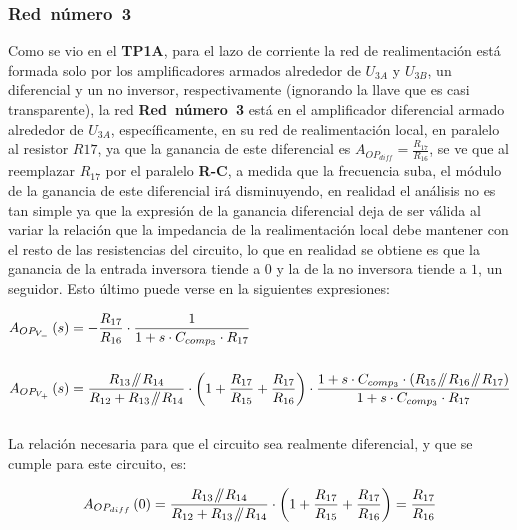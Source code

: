 \subsubsection{\textbf{Red~número~3}}

Como se vio en el \textbf{TP1A}, para el lazo de corriente la red de realimentación está formada solo por los amplificadores armados alrededor de $U_{3A}$ y $U_{3B}$, un diferencial y un no inversor, respectivamente (ignorando la llave que es casi transparente), la red \textbf{Red~número~3} está en el amplificador diferencial armado alrededor de $U_{3A}$, específicamente,  en su red de realimentación local, en paralelo al resistor $R17$, ya que la ganancia de este diferencial es $A_{OP_{diff}} = \frac{R_{17}}{R_{16}}$, se ve que al reemplazar $R_{17}$ por el paralelo \textbf{R-C}, a medida que la frecuencia suba, el módulo de la ganancia de este diferencial irá disminuyendo, en realidad el análisis no es tan simple ya que la expresión de la ganancia diferencial deja de ser válida al variar la relación que la impedancia de la realimentación local debe mantener con el resto de las resistencias del circuito, lo que en realidad se obtiene es que la ganancia de la entrada inversora tiende a $0$ y la de la no inversora tiende a $1$, un seguidor. Esto último puede verse en la siguientes expresiones:


\begin{align}
\begin{split}
A_{OP_{V_{-}}}\left( s \right) &= - \frac{R_{17}}{R_{16}} \cdot \frac{1}{1 + s \cdot C_{comp_{3}} \cdot R_{17}  }
\\\\
A_{OP_{V_{+}}}\left( s \right) &= \frac{ R_{13} \parallelresistors R_{14}  }{ R_{12} + R_{13} \parallelresistors R_{14} } \cdot \left( 1 + \frac{R_{17}}{R_{15}} + \frac{R_{17}}{R_{16}} \right) \cdot \frac{ 1 + s \cdot C_{comp_{3}} \cdot \left(  R_{15} \parallelresistors R_{16} \parallelresistors R_{17}   \right) }{1 + s \cdot C_{comp_{3}} \cdot R_{17} }
\end{split}
\end{align}\\

La relación necesaria para que el circuito sea realmente diferencial, y que se cumple para este circuito, es:

\begin{equation}
A_{OP_{diff}}\left( 0 \right) = \frac{ R_{13} \mathbin{\!/\mkern-5mu/\!} R_{14}  }{ R_{12} + R_{13} \mathbin{\!/\mkern-5mu/\!} R_{14} } \cdot \left( 1 + \frac{R_{17}}{R_{15}} + \frac{R_{17}}{R_{16}} \right) = \frac{R_{17}}{R_{16}}
\end{equation}\\

